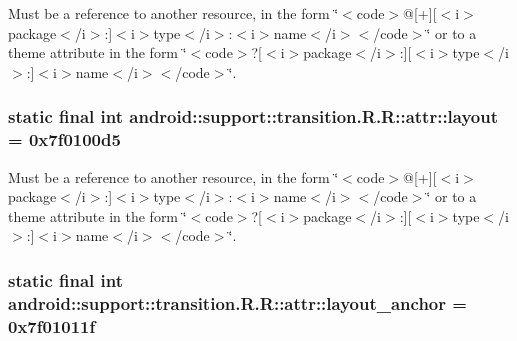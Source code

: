 Must be a reference to another resource, in the form \char`\"{}$<$code$>$@\mbox{[}+\mbox{]}\mbox{[}$<$i$>$package$<$/i$>$:\mbox{]}$<$i$>$type$<$/i$>$:$<$i$>$name$<$/i$>$$<$/code$>$\char`\"{} or to a theme attribute in the form \char`\"{}$<$code$>$?\mbox{[}$<$i$>$package$<$/i$>$:\mbox{]}\mbox{[}$<$i$>$type$<$/i$>$:\mbox{]}$<$i$>$name$<$/i$>$$<$/code$>$\char`\"{}. \hypertarget{classandroid_1_1support_1_1transition_1_1_r_1_1attr_5b38b08230f0458ed53a4c21a3efcdec}{
\subsubsection[{layout}]{\setlength{\rightskip}{0pt plus 5cm}static final int android::support::transition.R.R::attr::layout = 0x7f0100d5}}
\label{classandroid_1_1support_1_1transition_1_1_r_1_1attr_5b38b08230f0458ed53a4c21a3efcdec}


Must be a reference to another resource, in the form \char`\"{}$<$code$>$@\mbox{[}+\mbox{]}\mbox{[}$<$i$>$package$<$/i$>$:\mbox{]}$<$i$>$type$<$/i$>$:$<$i$>$name$<$/i$>$$<$/code$>$\char`\"{} or to a theme attribute in the form \char`\"{}$<$code$>$?\mbox{[}$<$i$>$package$<$/i$>$:\mbox{]}\mbox{[}$<$i$>$type$<$/i$>$:\mbox{]}$<$i$>$name$<$/i$>$$<$/code$>$\char`\"{}. \hypertarget{classandroid_1_1support_1_1transition_1_1_r_1_1attr_9c3a6b35debd5592af5a68d2a1174a74}{
\subsubsection[{layout\_\-anchor}]{\setlength{\rightskip}{0pt plus 5cm}static final int android::support::transition.R.R::attr::layout\_\-anchor = 0x7f01011f}}
\label{classandroid_1_1support_1_1transition_1_1_r_1_1attr_9c3a6b35debd5592af5a68d2a1174a74}


